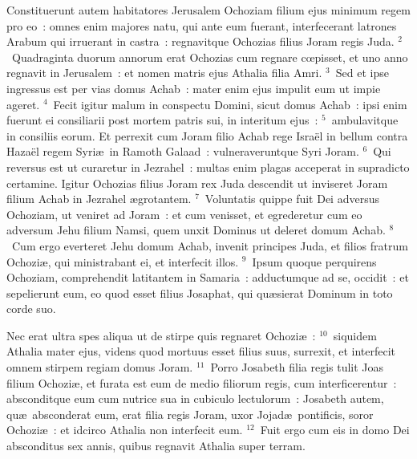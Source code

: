 \lettrine[lines=10,image=true,loversize=0.05,lraise=-0.03]{C}{}onstituerunt autem habitatores Jerusalem Ochoziam filium ejus minimum regem pro eo~: omnes enim majores natu, qui ante eum fuerant, interfecerant latrones Arabum qui irruerant in castra~: regnavitque Ochozias filius Joram regis Juda.
${}^{2}$~Quadraginta duorum annorum erat Ochozias cum regnare cœpisset, et uno anno regnavit in Jerusalem~: et nomen matris ejus Athalia filia Amri.
${}^{3}$~Sed et ipse ingressus est per vias domus Achab~: mater enim ejus impulit eum ut impie ageret.
${}^{4}$~Fecit igitur malum in conspectu Domini, sicut domus Achab~: ipsi enim fuerunt ei consiliarii post mortem patris sui, in interitum ejus~:
${}^{5}$~ambulavitque in consiliis eorum. Et perrexit cum Joram filio Achab rege Isra\"el in bellum contra Haza\"el regem Syri\ae\ in Ramoth Galaad~: vulneraveruntque Syri Joram.
${}^{6}$~Qui reversus est ut curaretur in Jezrahel~: multas enim plagas acceperat in supradicto certamine. Igitur Ochozias filius Joram rex Juda descendit ut inviseret Joram filium Achab in Jezrahel \ae grotantem.
${}^{7}$~Voluntatis quippe fuit Dei adversus Ochoziam, ut veniret ad Joram~: et cum venisset, et egrederetur cum eo adversum Jehu filium Namsi, quem unxit Dominus ut deleret domum Achab.
${}^{8}$~Cum ergo everteret Jehu domum Achab, invenit principes Juda, et filios fratrum Ochozi\ae , qui ministrabant ei, et interfecit illos.
${}^{9}$~Ipsum quoque perquirens Ochoziam, comprehendit latitantem in Samaria~: adductumque ad se, occidit~: et sepelierunt eum, eo quod esset filius Josaphat, qui qu\ae sierat Dominum in toto corde suo.

 Nec erat ultra spes aliqua ut de stirpe quis regnaret Ochozi\ae~:
${}^{10}$~siquidem Athalia mater ejus, videns quod mortuus esset filius suus, surrexit, et interfecit omnem stirpem regiam domus Joram.
${}^{11}$~Porro Josabeth filia regis tulit Joas filium Ochozi\ae , et furata est eum de medio filiorum regis, cum interficerentur~: absconditque eum cum nutrice sua in cubiculo lectulorum~: Josabeth autem, qu\ae\ absconderat eum, erat filia regis Joram, uxor Jojad\ae\ pontificis, soror Ochozi\ae~: et idcirco Athalia non interfecit eum.
${}^{12}$~Fuit ergo cum eis in domo Dei absconditus sex annis, quibus regnavit Athalia super terram.

